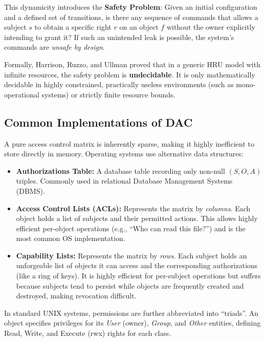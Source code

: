 This dynamicity introduces the \textbf{Safety Problem}: Given an initial configuration and a defined set of transitions, is there any sequence of commands that allows a subject $s$ to obtain a specific right $r$ on an object $f$ without the owner explicitly intending to grant it? If such an unintended leak is possible, the system's commands are \textit{unsafe by design}.

Formally, Harrison, Ruzzo, and Ullman proved that in a generic HRU model with infinite resources, the safety problem is \textbf{undecidable}. It is only mathematically decidable in highly constrained, practically useless environments (such as mono-operational systems) or strictly finite resource bounds.

\subsection{Common Implementations of DAC}
A pure access control matrix is inherently sparse, making it highly inefficient to store directly in memory. Operating systems use alternative data structures:
\begin{itemize}
    \item \textbf{Authorizations Table:} A database table recording only non-null $(S, O, A)$ triples. Commonly used in relational Database Management Systems (DBMS).
    \item \textbf{Access Control Lists (ACLs):} Represents the matrix by \textit{columns}. Each object holds a list of subjects and their permitted actions. This allows highly efficient per-object operations (e.g., ``Who can read this file?'') and is the most common OS implementation.
    \item \textbf{Capability Lists:} Represents the matrix by \textit{rows}. Each subject holds an unforgeable list of objects it can access and the corresponding authorizations (like a ring of keys). It is highly efficient for per-subject operations but suffers because subjects tend to persist while objects are frequently created and destroyed, making revocation difficult.
\end{itemize}

In standard UNIX systems, permissions are further abbreviated into ``triads''. An object specifies privileges for its \textit{User} (owner), \textit{Group}, and \textit{Other} entities, defining Read, Write, and Execute (rwx) rights for each class.

